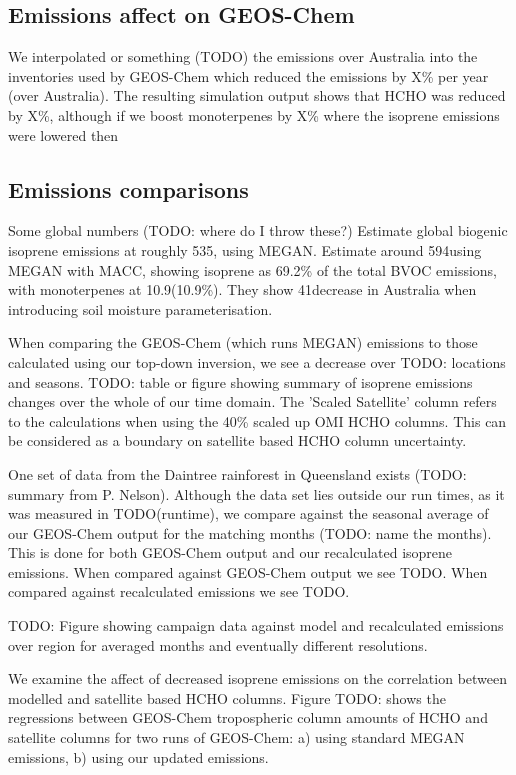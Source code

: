   \subsection{Emissions affect on GEOS-Chem}
    We interpolated or something (TODO) the emissions over Australia into the inventories used by GEOS-Chem which reduced the emissions by X\% per year (over Australia).
    The resulting simulation output shows that HCHO was reduced by X\%, although if we boost monoterpenes by X\% where the isoprene emissions were lowered then 
  
  \subsection{Emissions comparisons}
    
    Some global numbers (TODO: where do I throw these?)
    \citet{Guenther2012} Estimate global biogenic isoprene emissions at roughly 535\tgpyr, using MEGAN.
    \citet{Sindelarova2014} Estimate around 594\tgpyr using MEGAN with MACC, showing isoprene as 69.2\% of the total BVOC emissions, with monoterpenes at 10.9\tgpyr (10.9\%).
    They show 41\tgpyr decrease in Australia when introducing soil moisture parameterisation.
    
    
    When comparing the GEOS-Chem (which runs MEGAN) emissions to those calculated using our top-down inversion, we see a decrease over TODO: locations and seasons.
    TODO: table or figure showing summary of isoprene emissions changes over the whole of our time domain.
    The 'Scaled Satellite' column refers to the calculations when using the 40\% scaled up OMI HCHO columns. %
    This can be considered as a boundary on satellite based HCHO column uncertainty.
    
    One set of data from the Daintree rainforest in Queensland exists (TODO: summary from P. Nelson).
    Although the data set lies outside our run times, as it was measured in TODO(runtime), we compare against the seasonal average of our GEOS-Chem output for the matching months (TODO: name the months).
    This is done for both GEOS-Chem output and our recalculated isoprene emissions.
    When compared against GEOS-Chem output we see TODO.
    When compared against recalculated emissions we see TODO.
    
    TODO: Figure showing campaign data against model and recalculated emissions over region for averaged months and eventually different resolutions.
    
    We examine the affect of decreased isoprene emissions on the correlation between modelled and satellite based HCHO columns.
    Figure TODO: shows the regressions between GEOS-Chem tropospheric column amounts of HCHO and satellite columns for two runs of GEOS-Chem: a) using standard MEGAN emissions, b) using our updated emissions.
    
